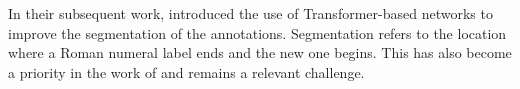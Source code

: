 

In their subsequent work, \textcite{chen2019harmony,chen2021attend} introduced the use of Transformer-based networks \parencite{vaswani2017attention} to improve the segmentation of the annotations. Segmentation refers to the location where a Roman numeral label ends and the new one begins. This has also become a priority in the work of \textcite{micchi2021deep} and remains a relevant challenge.
